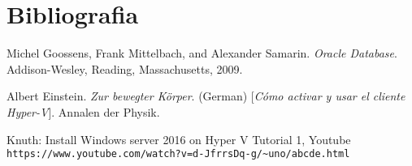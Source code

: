 \section{Bibliografia}
\begin{thebibliography}{9}
Michel Goossens, Frank Mittelbach, and Alexander Samarin. 
\textit{Oracle Database}. 
Addison-Wesley, Reading, Massachusetts, 2009.
 
Albert Einstein. 
\textit{Zur  bewegter K{\"o}rper}. (German) 
[\textit{Cómo activar y usar el cliente Hyper-V}]. 
Annalen der Physik.
 
Knuth:  Install Windows server 2016 on Hyper V Tutorial 1, Youtube
\\\texttt{https://www.youtube.com/watch?v=d-JfrrsDq-g/\~{}uno/abcde.html}
\end{thebibliography}